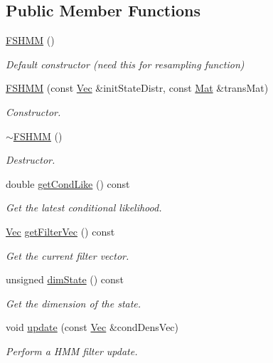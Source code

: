 \subsection*{Public Member Functions}
\begin{DoxyCompactItemize}
\item 
\hyperlink{classFSHMM_a7d9109a5f787b3842f84257b79791cb9}{F\+S\+H\+MM} ()
\begin{DoxyCompactList}\small\item\em Default constructor (need this for resampling function) \end{DoxyCompactList}\item 
\hyperlink{classFSHMM_a644606d0cb00e2e0779fe8dcf53e2a42}{F\+S\+H\+MM} (const \hyperlink{pmfs_8h_a4c7df05c6f5e8a0d15ae14bcdbc07152}{Vec} \&init\+State\+Distr, const \hyperlink{pmfs_8h_ae601f56a556993079f730483c574356f}{Mat} \&trans\+Mat)
\begin{DoxyCompactList}\small\item\em Constructor. \end{DoxyCompactList}\item 
\hyperlink{classFSHMM_a0d011b77cf9541a312fffa43d24fa41f}{$\sim$\+F\+S\+H\+MM} ()\hypertarget{classFSHMM_a0d011b77cf9541a312fffa43d24fa41f}{}\label{classFSHMM_a0d011b77cf9541a312fffa43d24fa41f}

\begin{DoxyCompactList}\small\item\em Destructor. \end{DoxyCompactList}\item 
double \hyperlink{classFSHMM_a38325b38c4f20521f50cc7891d44839d}{get\+Cond\+Like} () const 
\begin{DoxyCompactList}\small\item\em Get the latest conditional likelihood. \end{DoxyCompactList}\item 
\hyperlink{pmfs_8h_a4c7df05c6f5e8a0d15ae14bcdbc07152}{Vec} \hyperlink{classFSHMM_af58a522cbeb2afa6a9211ac75100c1c2}{get\+Filter\+Vec} () const 
\begin{DoxyCompactList}\small\item\em Get the current filter vector. \end{DoxyCompactList}\item 
unsigned \hyperlink{classFSHMM_a2f166ff74c89b2103477be60eeb098d1}{dim\+State} () const 
\begin{DoxyCompactList}\small\item\em Get the dimension of the state. \end{DoxyCompactList}\item 
void \hyperlink{classFSHMM_a3e8519b8370eecec760d098bb5d38b3e}{update} (const \hyperlink{pmfs_8h_a4c7df05c6f5e8a0d15ae14bcdbc07152}{Vec} \&cond\+Dens\+Vec)
\begin{DoxyCompactList}\small\item\em Perform a H\+MM filter update. \end{DoxyCompactList}\end{DoxyCompactItemize}


